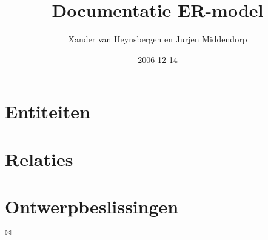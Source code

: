 \documentclass[]{article}
\title{Documentatie ER-model}
\author{Xander van Heynsbergen en Jurjen Middendorp\\ }
\date{2006-12-14}
\begin{document}
\ifpdf {} \else
{} \fi

\maketitle

\section{Entiteiten}

		
 
\section{Relaties}

		

	
\section{Ontwerpbeslissingen}
	

$\boxtimes$
\end{document}
